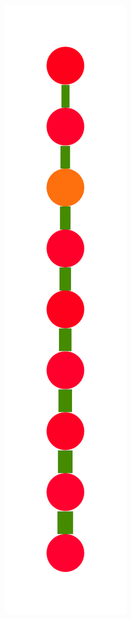 \documentclass[a4paper,10pt]{article}
\begin{document}
\begin{figure}
{    \includegraphics[scale=.14]{../figures/vector/6-3-recursion-induced-2.pdf}
}
\end{figure}
\end{document}
